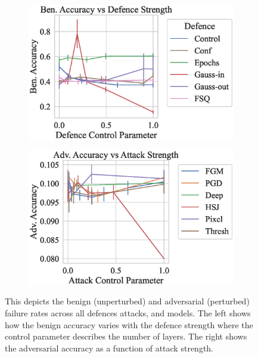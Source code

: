 \begin{figure}[!h]
    \centering
    \begin{subfigure}
        \centering
        \includegraphics[trim={0 10pt 0 10pt},clip,width=.45\textwidth]{mnist/def_param_vs_accuracy.eps}
    \end{subfigure}
    \begin{subfigure}
        \centering
        \includegraphics[trim={0 10pt 0 10pt},clip,width=.45\textwidth]{mnist/atk_param_vs_accuracy.eps}
    \end{subfigure}
    \caption{This depicts the benign (unperturbed) and adversarial (perturbed) failure rates across all defences attacks, and models. The left shows how the benign accuracy varies with the defence strength where the control parameter describes the number of layers. The right shows the adversarial accuracy as a function of attack strength.}
    \label{fig:mnist_strength}
\end{figure}


